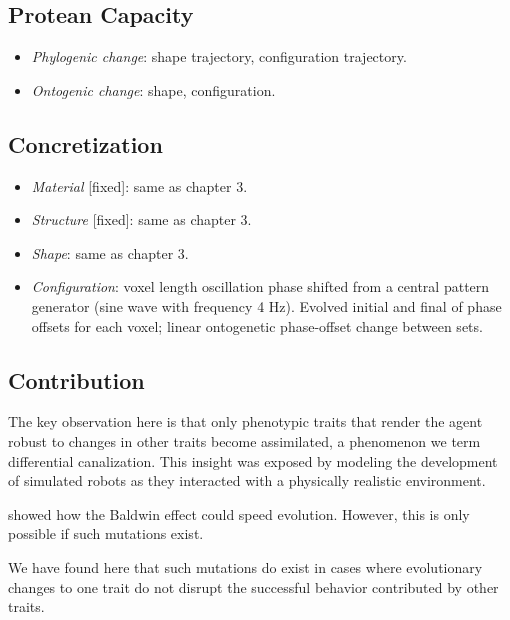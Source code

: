 \subsection{Protean Capacity}

\begin{itemize}
    \item \textit{Phylogenic change}: shape trajectory, configuration trajectory.
    \item \textit{Ontogenic change}: shape, configuration.
\end{itemize}


\subsection{Concretization}

\begin{itemize}
    \item \textit{Material} [fixed]: same as chapter 3.
    \item \textit{Structure} [fixed]: same as chapter 3.
    \item \textit{Shape}: same as chapter 3.
    \item \textit{Configuration}: voxel length oscillation phase shifted from a central pattern generator (sine wave with frequency 4 Hz).
    Evolved initial and final of phase offsets for each voxel; linear ontogenetic phase-offset change between sets.
\end{itemize}




\subsection{Contribution}


The key observation here is that only phenotypic traits that render the agent robust to changes in other traits become assimilated, a phenomenon we term differential canalization. 
This insight was exposed by modeling the development of simulated robots as they interacted with a physically realistic environment.

\citet{hinton1987learning} showed how the Baldwin effect could speed evolution.
However, this is only possible if such mutations exist.

We have found here that such mutations do exist in cases where evolutionary changes
to one trait do not disrupt the successful behavior contributed
by other traits.


